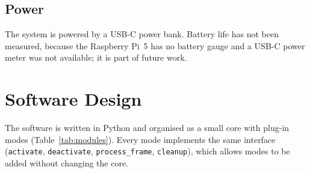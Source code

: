 \subsection*{Power}
The system is powered by a USB-C power bank. Battery life has not been measured, because the Raspberry Pi~5 has no battery gauge and a USB-C power meter was not available; it is part of future work.


\section{Software Design}
\label{sec:software}

The software is written in Python and organised as a small core with plug-in modes (Table~\ref{tab:modules}). Every mode implements the same interface (\texttt{activate}, \texttt{deactivate}, \texttt{process\_frame}, \texttt{cleanup}), which allows modes to be added without changing the core.

